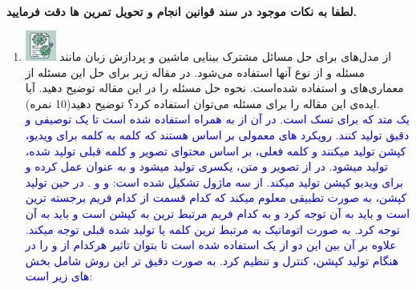 \documentclass[12pt]{article}
\begin{document}
\fontsize{12pt}{14pt}\selectfont



\\
{\fontsize{14}{22}\selectfont \textbf{لطفا به نکات موجود در سند قوانین انجام و تحویل تمرین ها دقت فرمایید. }}

\begin{enumerate}

    \section*{سوالات تئوری}
    \item \includegraphics[width=1cm]{figs/Allowed_with_contributino.jpg}
     از مدل‌های  برای حل مسائل مشترک بینایی ماشین و پردازش زبان مانند مسئله  و از نوع  آنها استفاده می‌شود. در مقاله زیر برای حل این مسئله از معماری‌های  و  استفاده شده‌است. نحوه حل مسئله را در این مقاله توضیح دهید. آیا ایده‌ی این مقاله را برای مسئله  می‌توان استفاده کرد؟ توضیح دهید(10 نمره).\\
    \textcolor{blue}{
     یک متد که برای تسک  است. در آن از  به همراه  استفاده شده است تا یک  توصیفی و دقیق تولید کنند. رویکرد های معمولی بر اساس  هستند که کلمه به کلمه برای ویدیو، کپشن تولید میکنند و کلمه فعلی، بر اساس محتوای تصویر و کلمه قبلی تولید شده، تولید میشود. در  از تصویر و متن، یکسری  تولید میشود و  به عنوان  عمل کرده و برای ویدیو کپشن تولید میکند.  از سه ماژول تشکیل شده است:  و  و . در حین تولید کپشن،  به صورت تطبیقی معلوم میکند که کدام قسمت از کدام فریم برجسته ترین است و باید به آن توجه کرد و به کدام فریم مرتبط ترین به کپشن است و باید به آن توجه کرد.  به صورت اتوماتیک به مرتبط ترین کلمه یا  تولید شده قبلی توجه میکند. علاوه بر آن بین این دو  از یک  استفاده شده است تا بتوان تاثیر هرکدام از  و  را در هنگام تولید کپشن، کنترل و تنظیم کرد.
    به صورت دقیق تر این روش شامل بخش های زیر است:\\
}
\end{enumerate}
\end{document}
